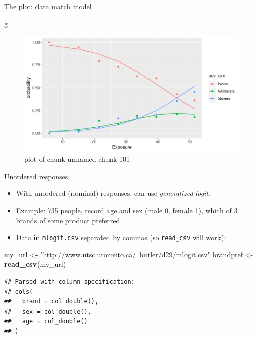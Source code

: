 \documentclass[ignorenonframetext,]{beamer}
\newenvironment{Shaded}{\begin{snugshade}}{\end{snugshade}}
\newcommand{\KeywordTok}[1]{\textcolor[rgb]{0.13,0.29,0.53}{\textbf{#1}}}
\newcommand{\NormalTok}[1]{#1}
\newcommand{\StringTok}[1]{\textcolor[rgb]{0.31,0.60,0.02}{#1}}
\begin{document}
\begin{frame}[fragile]{The plot: data match model}
\protect\hypertarget{the-plot-data-match-model}{}

\begin{Shaded}
\begin{Highlighting}[]
\NormalTok{g}
\end{Highlighting}
\end{Shaded}

\begin{figure}
\centering
\includegraphics{figure/unnamed-chunk-101-1.pdf}
\caption{plot of chunk unnamed-chunk-101}
\end{figure}

\end{frame}

\begin{frame}[fragile]{Unordered responses}
\protect\hypertarget{unordered-responses}{}

\begin{itemize}
\item
  With unordered (nominal) responses, can use \emph{generalized logit}.
\item
  Example: 735 people, record age and sex (male 0, female 1), which of 3
  brands of some product preferred.
\item
  Data in \texttt{mlogit.csv} separated by commas (so \texttt{read\_csv}
  will work):
\end{itemize}

\begin{Shaded}
\begin{Highlighting}[]
\NormalTok{my_url <-}\StringTok{ "http://www.utsc.utoronto.ca/~butler/d29/mlogit.csv"}
\NormalTok{brandpref <-}\StringTok{ }\KeywordTok{read_csv}\NormalTok{(my_url)}
\end{Highlighting}
\end{Shaded}

\begin{verbatim}
## Parsed with column specification:
## cols(
##   brand = col_double(),
##   sex = col_double(),
##   age = col_double()
## )
\end{verbatim}

\end{frame}
\end{document}
